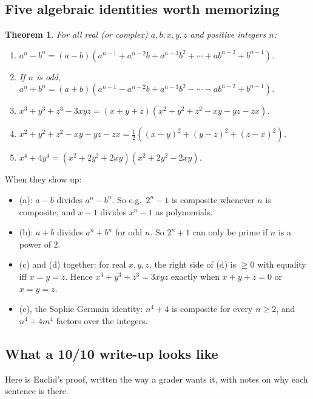 \documentclass[11pt]{article}
\theoremstyle{plain}
\newtheorem{theorem}{Theorem}
\theoremstyle{definition}
\begin{document}
\subsection{Five algebraic identities worth memorizing}

\begin{theorem}
For all real (or complex) $a, b, x, y, z$ and positive integers $n$:
\begin{enumerate}
  \item[(a)] $a^n - b^n = (a-b)\left(a^{n-1} + a^{n-2}b + a^{n-3}b^2 + \cdots + ab^{n-2} + b^{n-1}\right)$.
  \item[(b)] If $n$ is \emph{odd}, $a^n + b^n = (a+b)\left(a^{n-1} - a^{n-2}b + a^{n-3}b^2 - \cdots - ab^{n-2} + b^{n-1}\right)$.
  \item[(c)] $x^3 + y^3 + z^3 - 3xyz = (x+y+z)\left(x^2 + y^2 + z^2 - xy - yz - zx\right)$.
  \item[(d)] $x^2 + y^2 + z^2 - xy - yz - zx = \tfrac{1}{2}\left((x-y)^2 + (y-z)^2 + (z-x)^2\right)$.
  \item[(e)] $x^4 + 4y^4 = \left(x^2 + 2y^2 + 2xy\right)\left(x^2 + 2y^2 - 2xy\right)$.
\end{enumerate}
\end{theorem}
When they show up:
\begin{itemize}
  \item (a): $a - b$ divides $a^n - b^n$. So e.g.\ $2^n - 1$ is composite whenever $n$ is composite, and $x - 1$ divides $x^n - 1$ as polynomials.
  \item (b): $a + b$ divides $a^n + b^n$ for odd $n$. So $2^n + 1$ can only be prime if $n$ is a power of $2$.
  \item (c) and (d) together: for real $x, y, z$, the right side of (d) is $\ge 0$ with equality iff $x = y = z$. Hence $x^3 + y^3 + z^3 = 3xyz$ exactly when $x + y + z = 0$ or $x = y = z$.
  \item (e), the Sophie Germain identity: $n^4 + 4$ is composite for every $n \ge 2$, and $n^4 + 4m^4$ factors over the integers.
\end{itemize}

\subsection{What a 10/10 write-up looks like}

Here is Euclid's proof, written the way a grader wants it, with notes on why each sentence is there.
\end{document}

